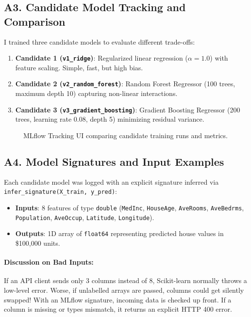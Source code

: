 \documentclass[11pt,a4paper]{article}
\begin{document}
\subsection{A3. Candidate Model Tracking and Comparison}
I trained three candidate models to evaluate different trade-offs:
\begin{enumerate}
    \item \textbf{Candidate 1 (\texttt{v1\_ridge})}: Regularized linear regression ($\alpha = 1.0$) with feature scaling. Simple, fast, but high bias.
    \item \textbf{Candidate 2 (\texttt{v2\_random\_forest})}: Random Forest Regressor (100 trees, maximum depth 10) capturing non-linear interactions.
    \item \textbf{Candidate 3 (\texttt{v3\_gradient\_boosting})}: Gradient Boosting Regressor (200 trees, learning rate 0.08, depth 5) minimizing residual variance.
\end{enumerate}

\begin{figure}[htbp]
\centering
{}
\caption{MLflow Tracking UI comparing candidate training runs and metrics.}
\end{figure}

\subsection{A4. Model Signatures and Input Examples}
Each candidate model was logged with an explicit signature inferred via \texttt{infer\_signature(X\_train, y\_pred)}:
\begin{itemize}
    \item \textbf{Inputs}: 8 features of type \texttt{double} (\texttt{MedInc}, \texttt{HouseAge}, \texttt{AveRooms}, \texttt{AveBedrms}, \texttt{Population}, \texttt{AveOccup}, \texttt{Latitude}, \texttt{Longitude}).
    \item \textbf{Outputs}: 1D array of \texttt{float64} representing predicted house values in \$100,000 units.
\end{itemize}

\paragraph{Discussion on Bad Inputs:}
If an API client sends only 3 columns instead of 8, Scikit-learn normally throws a low-level error. Worse, if unlabelled arrays are passed, columns could get silently swapped! With an MLflow signature, incoming data is checked up front. If a column is missing or types mismatch, it returns an explicit HTTP 400 error. 
\end{document}
